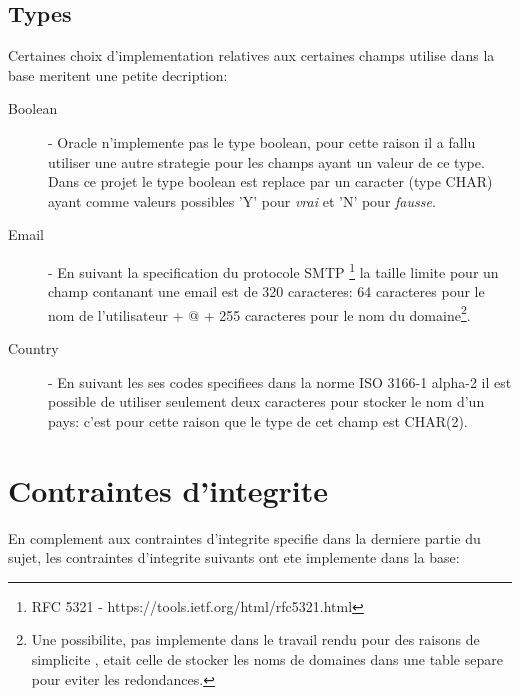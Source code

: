 \documentclass[twoside,openright,a4paper,11pt,french]{article}
\begin{document}
\subsection{Types}
Certaines choix d'implementation relatives aux certaines champs utilise dans la
base meritent une petite decription:


\begin{description}
\item[Boolean] - Oracle n'implemente pas le type boolean, pour cette raison il a
fallu utiliser une autre strategie pour les champs ayant un valeur de ce type.
Dans ce projet le type boolean est replace par un caracter (type CHAR) ayant
comme valeurs possibles 'Y' pour {\it vrai} et 'N' pour {\it fausse}.

\item[Email] - En suivant la specification du protocole SMTP
\footnote{RFC 5321 - https://tools.ietf.org/html/rfc5321.html}
la taille limite pour un champ contanant une email est de 320 caracteres: 64
caracteres pour le nom de l'utilisateur + @ + 255 caracteres pour le nom du
domaine\footnote{Une possibilite, pas implemente dans le travail rendu pour des
raisons de simplicite , etait celle de stocker les noms de domaines dans une
table separe pour eviter les redondances.}.

\item[Country] - En suivant les ses codes specifiees dans la norme ISO 3166-1
alpha-2 il est possible de utiliser seulement deux caracteres pour stocker le
nom d'un pays: c'est pour cette raison que le type de cet champ est CHAR(2).

\end{description}


\section{Contraintes d'integrite}
En complement aux contraintes d'integrite specifie dans la derniere partie du
sujet, les contraintes d'integrite suivants ont ete implemente dans la base:
\end{document}
